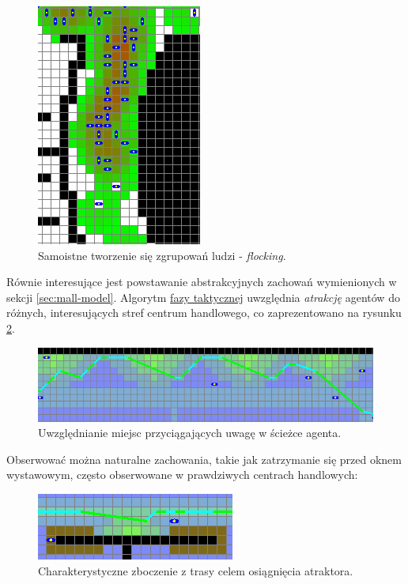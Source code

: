 \documentclass[a4paper, 12pt]{article}
\begin{document}
        \begin{figure}[H]
          \centering
          \includegraphics[scale=0.7]{./img/bottleneck.png}
          \caption{Samoistne tworzenie się zgrupowań ludzi - \emph{flocking}.}
          \label{fig:res-bottleneck}
        \end{figure}

Równie interesujące jest powstawanie abstrakcyjnych zachowań wymienionych w sekcji \ref{sec:mall-model}. Algorytm \hyperref[sec:tactical]{fazy taktycznej} uwzględnia \emph{atrakcję} agentów do różnych, interesujących stref centrum handlowego, co zaprezentowano na rysunku \ref{fig:res-attraction}.

        \begin{figure}[H]
          \centering
          \includegraphics[scale=0.7]{./img/attraction.png}
          \caption{Uwzględnianie miejsc przyciągających uwagę w ścieżce agenta.}
          \label{fig:res-attraction}
        \end{figure}

\noindent
Obserwować można naturalne zachowania, takie jak zatrzymanie się przed oknem wystawowym, często obserwowane w prawdziwych centrach handlowych:

        \begin{figure}[H]
          \centering
          \includegraphics[scale=0.7]{./img/attraction2.png}
          \caption{Charakterystyczne zboczenie z trasy celem osiągnięcia atraktora.}
          \label{fig:res-attraction-2}
        \end{figure}
\end{document}
